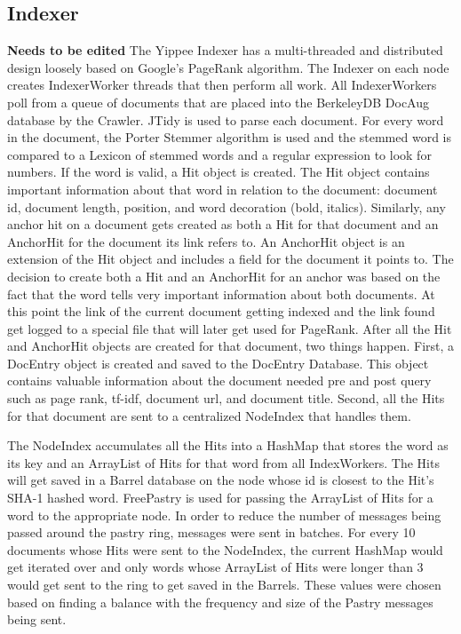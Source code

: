 \documentclass[11pt, letterpaper, oneside, twocolumn]{article}
\begin{document}
\subsection{Indexer}

\textbf{Needs to be edited}
The Yippee Indexer has a multi-threaded and distributed design loosely based on Google's  PageRank algorithm\cite{pagerank}. 
The Indexer on each node creates IndexerWorker threads that then perform all work. 
All IndexerWorkers poll from a queue of documents that are placed into the BerkeleyDB DocAug database by the Crawler. 
JTidy is used to parse each document. 
For every word in the document, the Porter Stemmer algorithm is used and the stemmed word is compared to a Lexicon of stemmed words and a regular expression to look for numbers. 
If the word is valid, a Hit object is created. 
The Hit object contains important information about that word in relation to the document: document id, document length, position, and word decoration (bold, italics). 
Similarly, any anchor hit on a document gets created as both a Hit for that document and an AnchorHit for the document its link refers to. 
An AnchorHit object is an extension of the Hit object and includes a field for the document it points to. 
The decision to create both a Hit and an AnchorHit for an anchor was based on the fact that the word tells very important information about both documents. 
At this point the link of the current document getting indexed and the link found get logged to a special file that will later get used for PageRank. 
After all the Hit and AnchorHit objects are created for that document, two things happen. 
First, a DocEntry object is created and saved to the DocEntry Database. 
This object contains valuable information about the document needed pre and post query such as page rank, tf-idf, document url, and document title. 
Second, all the Hits for that document are sent to a centralized NodeIndex that handles them.


The NodeIndex accumulates all the Hits into a HashMap that stores the word as its key and an ArrayList of Hits for that word from all IndexWorkers. 
The Hits will get saved in a Barrel database on the node whose id is closest to the Hit’s SHA-1 hashed word. 
FreePastry is used for passing the ArrayList of Hits for a word to the appropriate node. 
In order to reduce the number of messages being passed around the pastry ring, messages were sent in batches. 
For every 10 documents whose Hits were sent to the NodeIndex, the current HashMap would get iterated over and only words whose ArrayList of Hits were longer than 3 would get sent to the ring to get saved in the Barrels. 
These values were chosen based on finding a balance with the frequency and size of the Pastry messages being sent. 
\end{document}
